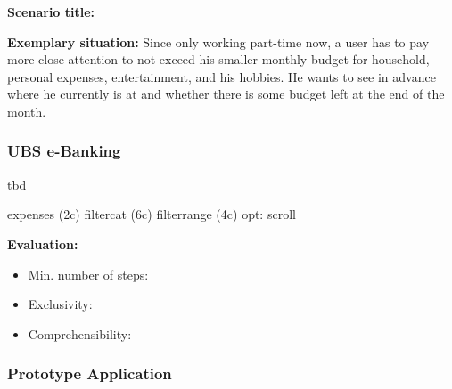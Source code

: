 \textbf{Scenario title:} \scenfour

\textbf{Exemplary situation:} Since only working part-time now, a user has to pay more close attention to not exceed his smaller monthly budget for household, personal expenses, entertainment, and his hobbies. He wants to see in advance where he currently is at and whether there is some budget left at the end of the month.



\subsubsection{UBS e-Banking}

tbd

expenses (2c)
filtercat (6c)
filterrange (4c)
opt: scroll

\textbf{Evaluation:} 
\begin{itemize}[noitemsep,nolistsep]
	\item Min. number of steps: \textbf{}
	\item Exclusivity: \textbf{}
	\item Comprehensibility: \textbf{}
\end{itemize}



\subsubsection{Prototype Application}

